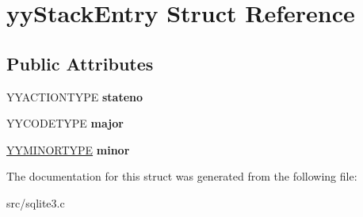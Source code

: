 \hypertarget{structyy_stack_entry}{\section{yy\-Stack\-Entry Struct Reference}
\label{structyy_stack_entry}
}
\subsection*{Public Attributes}
\begin{DoxyCompactItemize}
\item 
\hypertarget{structyy_stack_entry_a108164609c2e841577cc3533d8f0180d}{Y\-Y\-A\-C\-T\-I\-O\-N\-T\-Y\-P\-E {\bfseries stateno}}\label{structyy_stack_entry_a108164609c2e841577cc3533d8f0180d}

\item 
\hypertarget{structyy_stack_entry_a7624d02bcf945d48068f4c383551725c}{Y\-Y\-C\-O\-D\-E\-T\-Y\-P\-E {\bfseries major}}\label{structyy_stack_entry_a7624d02bcf945d48068f4c383551725c}

\item 
\hypertarget{structyy_stack_entry_a024e1e64bce5945080629a2dd8d1bb4f}{\hyperlink{union_y_y_m_i_n_o_r_t_y_p_e}{Y\-Y\-M\-I\-N\-O\-R\-T\-Y\-P\-E} {\bfseries minor}}\label{structyy_stack_entry_a024e1e64bce5945080629a2dd8d1bb4f}

\end{DoxyCompactItemize}


The documentation for this struct was generated from the following file\-:\begin{DoxyCompactItemize}
\item 
src/sqlite3.\-c\end{DoxyCompactItemize}
